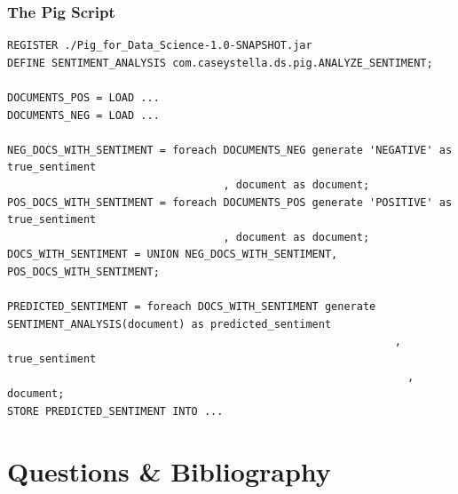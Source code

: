 \documentclass{beamer}
\begin{document}
\begin{frame}[fragile]
\frametitle{The Pig Script}
\lstset {
  basicstyle=\ttfamily\scriptsize,
  breaklines=true
}
\begin{lstlisting}
REGISTER ./Pig_for_Data_Science-1.0-SNAPSHOT.jar
DEFINE SENTIMENT_ANALYSIS com.caseystella.ds.pig.ANALYZE_SENTIMENT;

DOCUMENTS_POS = LOAD ...
DOCUMENTS_NEG = LOAD ...

NEG_DOCS_WITH_SENTIMENT = foreach DOCUMENTS_NEG generate 'NEGATIVE' as true_sentiment
							      , document as document;
POS_DOCS_WITH_SENTIMENT = foreach DOCUMENTS_POS generate 'POSITIVE' as true_sentiment
							      , document as document;
DOCS_WITH_SENTIMENT = UNION NEG_DOCS_WITH_SENTIMENT, POS_DOCS_WITH_SENTIMENT;

PREDICTED_SENTIMENT = foreach DOCS_WITH_SENTIMENT generate SENTIMENT_ANALYSIS(document) as predicted_sentiment
                              						         , true_sentiment
						                                       , document;
STORE PREDICTED_SENTIMENT INTO ...
\end{lstlisting}
\end{frame}




\section{Questions \& Bibliography}
\end{document}
